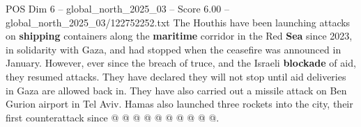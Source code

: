\begin{textsample}{POS Dim 6 – global\_north\_2025\_03 – Score 6.00 – global\_north\_2025\_03/122752252.txt}
The Houthis have been launching attacks on \textbf{shipping} containers along the \textbf{maritime} corridor in the Red \textbf{Sea} since 2023, in solidarity with Gaza, and had stopped when the ceasefire was announced in January.
However, ever since the breach of truce, and the Israeli \textbf{blockade} of aid, they resumed attacks.
They have declared they will not stop until aid deliveries in Gaza are allowed back in.
They have also carried out a missile attack on Ben Gurion airport in Tel Aviv.
Hamas also launched three rockets into the city, their first counterattack since @ @ @ @ @ @ @ @ @ @.

\end{textsample}
